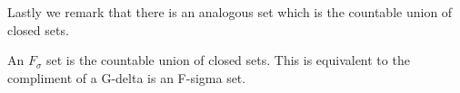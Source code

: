 Lastly we remark that there is an analogous set which is the countable union of closed sets.
\begin{definition}
    An $F_\sigma$ set is the countable union of closed sets.  This is equivalent to the compliment of a G-delta is an F-sigma set.  
\end{definition}

